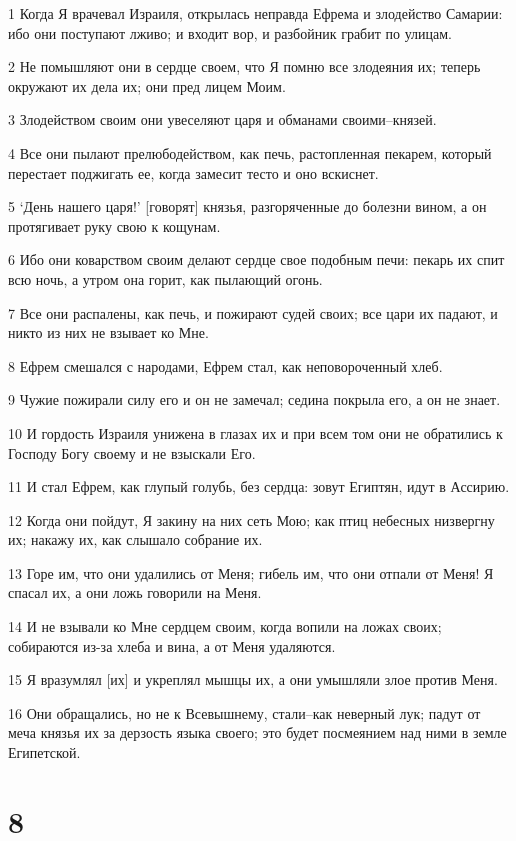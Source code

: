 \par 1 Когда Я врачевал Израиля, открылась неправда Ефрема и злодейство Самарии: ибо они поступают лживо; и входит вор, и разбойник грабит по улицам.
\par 2 Не помышляют они в сердце своем, что Я помню все злодеяния их; теперь окружают их дела их; они пред лицем Моим.
\par 3 Злодейством своим они увеселяют царя и обманами своими--князей.
\par 4 Все они пылают прелюбодейством, как печь, растопленная пекарем, который перестает поджигать ее, когда замесит тесто и оно вскиснет.
\par 5 `День нашего царя!' [говорят] князья, разгоряченные до болезни вином, а он протягивает руку свою к кощунам.
\par 6 Ибо они коварством своим делают сердце свое подобным печи: пекарь их спит всю ночь, а утром она горит, как пылающий огонь.
\par 7 Все они распалены, как печь, и пожирают судей своих; все цари их падают, и никто из них не взывает ко Мне.
\par 8 Ефрем смешался с народами, Ефрем стал, как неповороченный хлеб.
\par 9 Чужие пожирали силу его и он не замечал; седина покрыла его, а он не знает.
\par 10 И гордость Израиля унижена в глазах их и при всем том они не обратились к Господу Богу своему и не взыскали Его.
\par 11 И стал Ефрем, как глупый голубь, без сердца: зовут Египтян, идут в Ассирию.
\par 12 Когда они пойдут, Я закину на них сеть Мою; как птиц небесных низвергну их; накажу их, как слышало собрание их.
\par 13 Горе им, что они удалились от Меня; гибель им, что они отпали от Меня! Я спасал их, а они ложь говорили на Меня.
\par 14 И не взывали ко Мне сердцем своим, когда вопили на ложах своих; собираются из-за хлеба и вина, а от Меня удаляются.
\par 15 Я вразумлял [их] и укреплял мышцы их, а они умышляли злое против Меня.
\par 16 Они обращались, но не к Всевышнему, стали--как неверный лук; падут от меча князья их за дерзость языка своего; это будет посмеянием над ними в земле Египетской.

\chapter{8}

